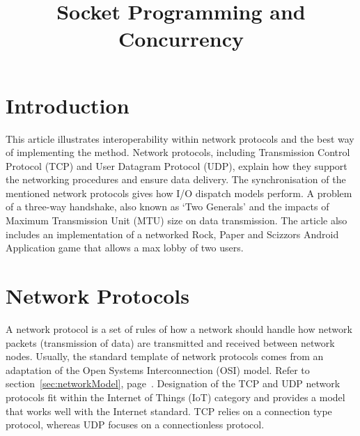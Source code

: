 \documentclass[conference]{IEEEtran}
\begin{document}
	\title{Socket Programming and Concurrency}

	\author{
	}

     \maketitle
    
    \thispagestyle{plain}
    \pagestyle{plain}
    
    \begin{abstract}
    
    \end{abstract}

    \begin{IEEEkeywords}
        
    \end{IEEEkeywords}

    \section{Introduction}
      This article illustrates interoperability within network protocols and the best way of implementing the method. Network protocols, including Transmission Control Protocol (TCP) and User Datagram Protocol (UDP), explain how they support the networking procedures and ensure data delivery. The synchronisation of the mentioned network protocols gives how I/O dispatch models perform. A problem of a three-way handshake, also known as `Two Generals' and the impacts of Maximum Transmission Unit (MTU) size on data transmission. The article also includes an implementation of a networked Rock, Paper and Scizzors Android Application game that allows a max lobby of two users.

    \section{Network Protocols}
      A network protocol is a set of rules of how a network should handle how network packets (transmission of data) are transmitted and received between network nodes. Usually, the standard template of network protocols comes from an adaptation of the Open Systems Interconnection (OSI) model. Refer to section~\ref{sec:networkModel}, page~\pageref{sec:networkModel}. Designation of the TCP and UDP network protocols fit within the Internet of Things (IoT) category and provides a model that works well with the Internet standard. TCP relies on a connection type protocol, whereas UDP focuses on a connectionless protocol.
\end{document}
